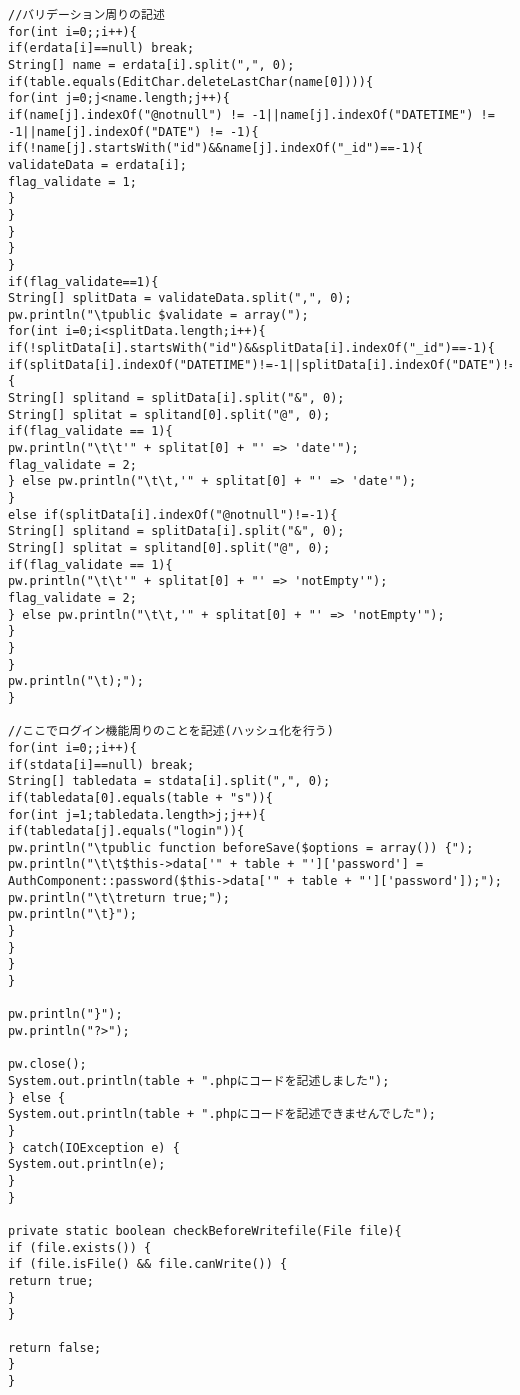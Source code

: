 \documentclass{funthesis}
\begin{document}
\begin{lstlisting}[caption=WriteModel .java,label=1]
//バリデーション周りの記述
for(int i=0;;i++){
if(erdata[i]==null) break;
String[] name = erdata[i].split(",", 0);
if(table.equals(EditChar.deleteLastChar(name[0]))){
for(int j=0;j<name.length;j++){
if(name[j].indexOf("@notnull") != -1||name[j].indexOf("DATETIME") != -1||name[j].indexOf("DATE") != -1){
if(!name[j].startsWith("id")&&name[j].indexOf("_id")==-1){
validateData = erdata[i];
flag_validate = 1;
}
}
}
}
}
if(flag_validate==1){
String[] splitData = validateData.split(",", 0);
pw.println("\tpublic $validate = array(");
for(int i=0;i<splitData.length;i++){
if(!splitData[i].startsWith("id")&&splitData[i].indexOf("_id")==-1){
if(splitData[i].indexOf("DATETIME")!=-1||splitData[i].indexOf("DATE")!=-1){
String[] splitand = splitData[i].split("&", 0);
String[] splitat = splitand[0].split("@", 0);
if(flag_validate == 1){
pw.println("\t\t'" + splitat[0] + "' => 'date'");
flag_validate = 2;
} else pw.println("\t\t,'" + splitat[0] + "' => 'date'");
}
else if(splitData[i].indexOf("@notnull")!=-1){
String[] splitand = splitData[i].split("&", 0);
String[] splitat = splitand[0].split("@", 0);
if(flag_validate == 1){
pw.println("\t\t'" + splitat[0] + "' => 'notEmpty'");
flag_validate = 2;
} else pw.println("\t\t,'" + splitat[0] + "' => 'notEmpty'");
}
}
}
pw.println("\t);");
}

//ここでログイン機能周りのことを記述(ハッシュ化を行う)
for(int i=0;;i++){
if(stdata[i]==null) break;
String[] tabledata = stdata[i].split(",", 0);
if(tabledata[0].equals(table + "s")){
for(int j=1;tabledata.length>j;j++){
if(tabledata[j].equals("login")){
pw.println("\tpublic function beforeSave($options = array()) {");
pw.println("\t\t$this->data['" + table + "']['password'] = AuthComponent::password($this->data['" + table + "']['password']);");
pw.println("\t\treturn true;");
pw.println("\t}");
}
}
}
}

pw.println("}");
pw.println("?>");

pw.close();
System.out.println(table + ".phpにコードを記述しました");
} else {
System.out.println(table + ".phpにコードを記述できませんでした");
}
} catch(IOException e) {
System.out.println(e);
}
}

private static boolean checkBeforeWritefile(File file){
if (file.exists()) {
if (file.isFile() && file.canWrite()) {
return true;
}
}

return false;
}
}
\end{lstlisting}　

\listoffigures

\listoftables
\end{document}
